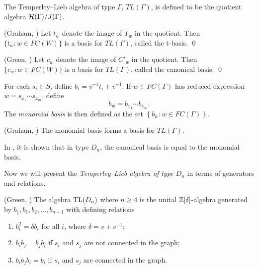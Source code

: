 \begin{definition}
The Temperley--Lieb algebra of type $\Gamma$, $TL(\Gamma)$, is defined to be the quotient algebra $\mathcal{H}(\Gamma)/J(\Gamma)$. 
\end{definition}


\begin{theorem}
{\rm (Graham, \cite{Graham1995})} Let $t_{w}$ denote the image of $T_{w}$ in the quotient.
Then $\{t_{w}:w\in FC(W)\}$ is a basis for $TL(\Gamma)$, called the t-basis.
\qed 
\label{t-basis}
\end{theorem}

\begin{theorem}{\rm (Green, \cite{Green1999})}
Let $c_{w}$ denote the image of $C'_{w}$ in the quotient.
Then $\{c_{w}:w\in FC(W)\}$ is a basis for $TL(\Gamma)$, called the canonical basis.
\qed 
\label{c-basis}
\end{theorem}

\begin{definition}
\rm For each $s_{i}\in S$, define $b_{i}=v^{-1}t_{i}+v^{-1}$. If
$w\in FC(\Gamma)$ has reduced expression $\overline{w}=s_{x_{1}}\cdots s_{x_{m}}$,
define 
\[
b_{w}=b_{x_{1}}\cdots b_{x_{m}}.
\]
The \emph{monomial basis} is then defined as the set  $\left\{ b_{w}:w\in FC(\Gamma)\right\}$.
\end{definition}
\begin{theorem}
{\rm (Graham, \cite{Graham1995})}
The monomial basis forms a basis for $TL(\Gamma).$ 
\end{theorem}
\begin{remark}
In \cite{Green1999}, it is shown that in type $D_n$, the canonical basis is equal to the monomial basis.
\end{remark}

Now we will present the \emph{Temperley--Lieb algebra of type $D_{n}$} in terms of generators and relations.

\begin{theorem}{\rm (Green, \cite{Green2006a})}\label{def:TL(D)}
The algebra $\operatorname{TL}(D_{n})$ where $n\ge4$  is the unital $\mathbb{Z}[\delta]$-algebra generated by $b_{\overline{1}},b_{1},b_{2},\ldots,b_{n-1}$ with defining relations
\begin{enumerate}[leftmargin=0.6in]
\item $b_{i}^{2}=\delta b_{i}$ for all $i$, where $\delta=v+v^{-1}$;
\item $b_{i}b_{j} = b_{j}b_{i}$ if $s_i$ and $s_j$ are not connected in the graph;
\item $b_{i}b_{j}b_{i} = b_{i}$ if $s_i$ and $s_j$ are connected in the graph.
\end{enumerate}
\end{theorem}

